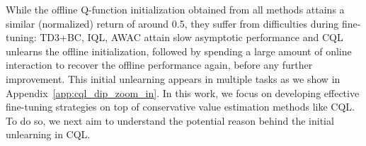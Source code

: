 
While the offline Q-function initialization obtained from all methods attains a similar (normalized) return of around 0.5, they suffer from difficulties during fine-tuning: TD3+BC, IQL, AWAC attain slow asymptotic performance and CQL unlearns the offline initialization, followed by spending a large amount of online interaction to recover the offline performance again, before any further improvement. This initial unlearning appears in multiple tasks as we show in Appendix~\ref{app:cql_dip_zoom_in}. In this work, we focus on developing effective fine-tuning strategies on top of conservative value estimation methods like CQL. To do so, we next aim to understand the potential reason behind the initial unlearning in CQL.  

